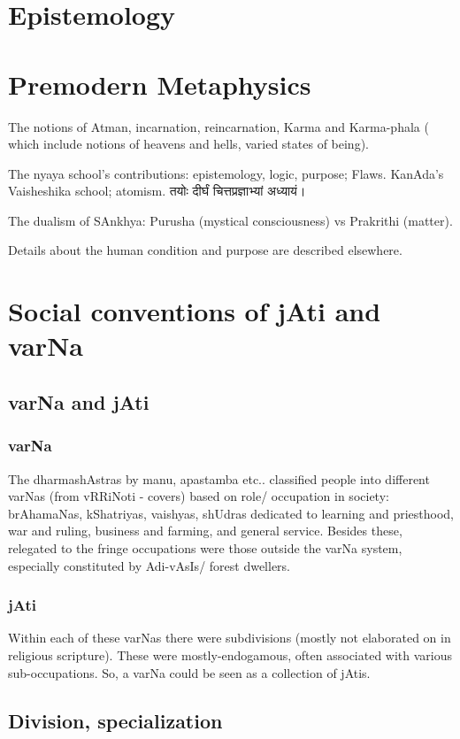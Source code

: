 \documentclass[oneside, article]{memoir}
\begin{document}
\section{Epistemology}
\tbc

\section{Premodern Metaphysics}
The notions of Atman, incarnation, reincarnation, Karma and Karma-phala ( which include notions of heavens and hells, varied states of being).

\subitem The nyaya school's contributions: epistemology, logic, purpose; Flaws. KanAda's Vaisheshika school; atomism. तयोः दीर्घं चित्तप्रज्ञाभ्यां अध्यायं।

\subitem The dualism of SAnkhya: Purusha (mystical consciousness) vs Prakrithi (matter).

Details about the human condition and purpose are described elsewhere.

\section{Social conventions of jAti and varNa}
\subsection{varNa and jAti}
\subsubsection{varNa}
The dharmashAstras by manu, apastamba etc.. classified people into different varNas (from vRRiNoti - covers) based on role/ occupation in society: brAhamaNas, kShatriyas, vaishyas, shUdras dedicated to learning and priesthood, war and ruling, business and farming, and general service. Besides these, relegated to the fringe occupations were those outside the varNa system, especially constituted by Adi-vAsIs/ forest dwellers.

\subsubsection{jAti}
Within each of these varNas there were subdivisions (mostly not elaborated on in religious scripture). These were mostly-endogamous, often associated with various sub-occupations. So, a varNa could be seen as a collection of jAtis.


\subsection{Division, specialization}
\end{document}
